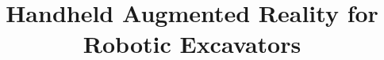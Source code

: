 \documentclass[10pt,twoside,a4paper]{report}
\begin{document}
\title{Handheld Augmented Reality for Robotic Excavators}




\projectYear{\the\year} %

\maketitle
\pagestyle{plain}

\pagestyle{empty}
\end{document}
